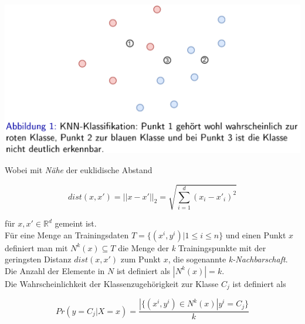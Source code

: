 \documentclass{report}
\begin{document}
\begin{center}
  \includegraphics[scale=.275]{ml05_1}
\end{center}

Wobei mit \textit{Nähe} der euklidische Abstand

$$dist(x, x') = ||x - x'||_2 = \sqrt{\sum_{i=1}^d(x_i - x'_i)^2}$$

für $x, x' \in \mathbb{R}^d$ gemeint ist.\\
Für eine Menge an Trainingsdaten $T = \{(x^i, y^i) | 1\leq i \leq n\}$ und einen Punkt $x$
definiert man mit $N^k(x)\subseteq T$ die Menge der \textit{k} Trainingspunkte mit der geringsten Distanz $dist(x,x')$ zum Punkt $x$,
die sogenannte \textit{k-Nachbarschaft}. Die Anzahl der Elemente in $N$ ist definiert als $|N^k(x)| = k$.\\
Die Wahrscheinlichkeit der Klassenzugehörigkeit zur Klasse $C_j$ ist definiert als

$$Pr(y = C_j | X = x) = \frac{|\{(x^i, y^i) \in N^k(x) | y^i = C_j\}}{k}$$
\end{document}

